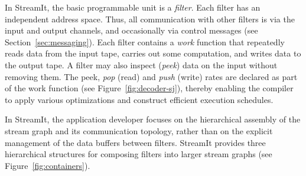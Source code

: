 \label{sec:streamit}
\vspace{-11pt}

In StreamIt, the basic programmable unit is a {\it filter}.  Each
filter has an independent address space. Thus, all communication with
other filters is via the input and output channels, and occasionally
via control messages (see Section~\ref{sec:messaging}). Each filter
contains a {\it work} function that repeatedly reads data from the
input tape, carries out some computation, and writes data to the
output tape. A filter may also inspect ({\it peek}) data on the input
without removing them. The peek, {\it pop} (read) and {\it push}
(write) rates are declared as part of the work function (see
Figure~\ref{fig:decoder-sj}), thereby enabling the compiler to apply
various optimizations and construct efficient execution schedules.

\begin{figure}[t]
\end{figure}

In StreamIt, the application developer focuses on the hierarchical
assembly of the stream graph and its communication topology, rather
than on the explicit management of the data buffers between filters.
StreamIt provides three hierarchical structures for composing filters
into larger stream graphs (see Figure~\ref{fig:containers}).


